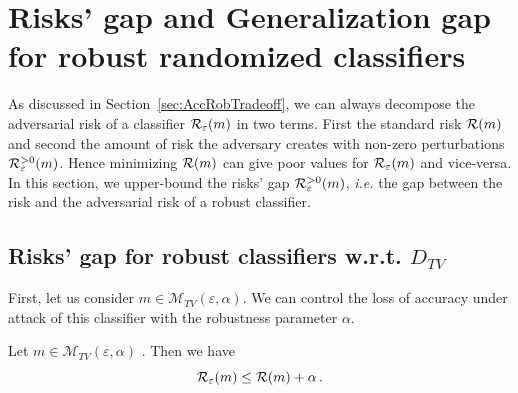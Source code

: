 \section{Risks' gap and Generalization gap for robust randomized classifiers}
\label{section::LearningAdversarialGap}

As discussed in Section~\ref{sec:AccRobTradeoff}, we can always decompose the adversarial risk of a classifier $\mathcal{R}_\varepsilon(m)$ in two terms. First the standard risk $\mathcal{R}(m )$  and second the amount of risk the adversary creates with non-zero perturbations $\mathcal{R}^{>0}_\varepsilon(m)$.
Hence minimizing $\mathcal{R}(m )$ can give poor values for $\mathcal{R}_\varepsilon(m )$ and vice-versa. In this section, we upper-bound the risks' gap $\mathcal{R}^{>0}_\varepsilon(m )$, \emph{i.e.} the gap between the risk and the adversarial risk of a robust classifier.

\subsection{Risks' gap for robust classifiers w.r.t. $D_{TV}$}

First, let us consider $m  \in \mathcal{M}_{TV}\left(\varepsilon,\alpha\right)$.
We can control the loss of accuracy under attack of this classifier with the robustness parameter $\alpha$. 

\begin{thm}
\label{th:TVboundRisk}
 Let $m  \in \mathcal{M}_{TV}\left(\varepsilon,\alpha\right)$ . Then we have
\begin{equation*}
    \mathcal{R}_\varepsilon(m )  \leq \mathcal{R}(m ) + \alpha \thinspace.
\end{equation*}
\end{thm}

